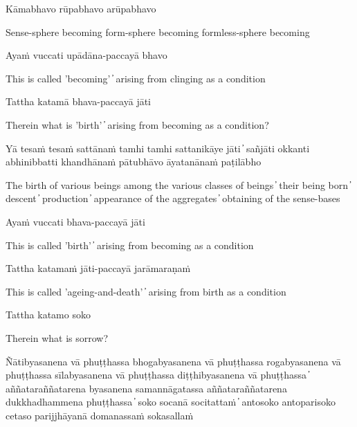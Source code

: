 Kāmabhavo rūpabhavo arūpabhavo

\begin{cprenglish}
  Sense-sphere becoming form-sphere becoming formless-sphere becoming
\end{cprenglish}

Ayaṁ vuccati upādāna-paccayā bhavo

\begin{cprenglish}
  This is called 'becoming'  ̓  arising from clinging as a condition
\end{cprenglish}

Tattha katamā bhava-paccayā jāti

\begin{cprenglish}
  Therein what is 'birth'  ̓  arising from becoming as a condition?
\end{cprenglish}

Yā tesaṁ tesaṁ sattānaṁ tamhi tamhi sattanikāye jāti  ̓  sañjāti okkanti abhinibbatti khandhānaṁ pātubhāvo āyatanānaṁ paṭilābho

\begin{cprenglish}
  The birth of various beings among the various classes of beings  ̓  their being born  ̓  descent  ̓  production  ̓  appearance of the aggregates  ̓  obtaining of the sense-bases
\end{cprenglish}

Ayaṁ vuccati bhava-paccayā jāti

\begin{cprenglish}
  This is called 'birth'  ̓  arising from becoming as a condition
\end{cprenglish}

Tattha katamaṁ jāti-paccayā jarāmaraṇaṁ

\begin{cprenglish}
  This is called 'ageing-and-death'  ̓  arising from birth as a condition
\end{cprenglish}

Tattha katamo soko

\begin{cprenglish}
  Therein what is sorrow?
\end{cprenglish}

Ñātibyasanena vā phuṭṭhassa bhogabyasanena vā phuṭṭhassa rogabyasanena vā phuṭṭhassa sīlabyasanena vā phuṭṭhassa diṭṭhibyasanena vā phuṭṭhassa  ̓  aññataraññatarena byasanena samannāgatassa aññataraññatarena dukkhadhammena phuṭṭhassa  ̓  soko socanā socitattaṁ  ̓  antosoko antoparisoko cetaso parijjhāyanā domanassaṁ sokasallaṁ

